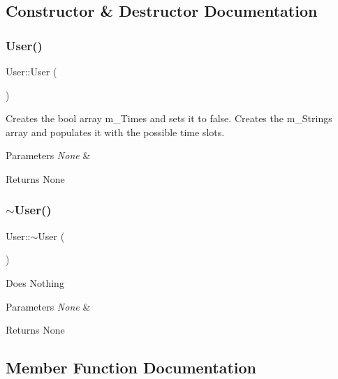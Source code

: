 \subsection{Constructor \& Destructor Documentation}
\mbox{\label{class_user_a4a0137053e591fbb79d9057dd7d2283d}} 
\subsubsection{\texorpdfstring{User()}{User()}}
{\footnotesize\ttfamily User\+::\+User (\begin{DoxyParamCaption}{ }\end{DoxyParamCaption})}

Creates the bool array m\+\_\+\+Times and sets it to false. Creates the m\+\_\+\+Strings array and populates it with the possible time slots. 
\begin{DoxyParams}{Parameters}
{\em None} & \\
\hline
\end{DoxyParams}
\begin{DoxyReturn}{Returns}
None 
\end{DoxyReturn}
\mbox{\label{class_user_ac00b72ad64eb4149f7b21b9f5468c2b2}} 
\subsubsection{\texorpdfstring{$\sim$\+User()}{~User()}}
{\footnotesize\ttfamily User\+::$\sim$\+User (\begin{DoxyParamCaption}{ }\end{DoxyParamCaption})}

Does Nothing 
\begin{DoxyParams}{Parameters}
{\em None} & \\
\hline
\end{DoxyParams}
\begin{DoxyReturn}{Returns}
None 
\end{DoxyReturn}


\subsection{Member Function Documentation}
\mbox{\label{class_user_a3a637aa0a7a7b37885f2cd7dc77ecd99}} 
